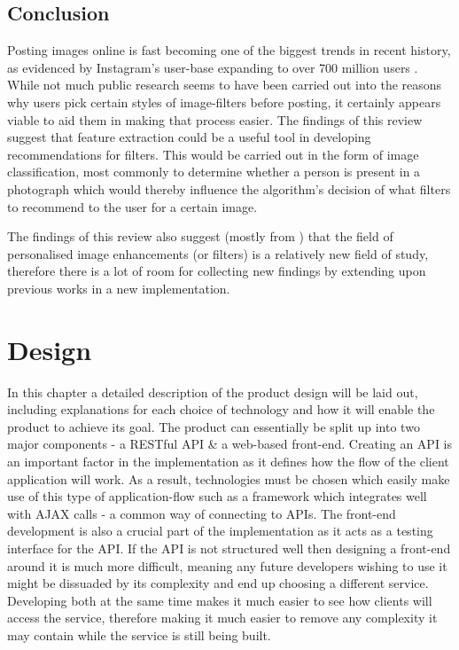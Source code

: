\documentclass[a4paper,12pt]{report}
\begin{document}
  \section{Conclusion}
    Posting images online is fast becoming one of the biggest trends in recent history, as evidenced by Instagram's user-base expanding to over 700 million users \citep{instagram2017users}. While not much public research seems to have been carried out into the reasons why users pick certain styles of image-filters before posting, it certainly appears viable to aid them in making that process easier.
    The findings of this review suggest that feature extraction could be a useful tool in developing recommendations for filters. This would be carried out in the form of image classification, most commonly to determine whether a person is present in a photograph which would thereby influence the algorithm's decision of what filters to recommend to the user for a certain image.

    The findings of this review also suggest (mostly from \cite{kang2010personalization,caicedo2011collaborative}) that the field of personalised image enhancements (or filters) is a relatively new field of study, therefore there is a lot of room for collecting new findings by extending upon previous works in a new implementation.

\chapter{Design}
  In this chapter a detailed description of the product design will be laid out, including explanations for each choice of technology and how it will enable the product to achieve its goal. The product can essentially be split up into two major components - a RESTful API \& a web-based front-end. Creating an API is an important factor in the implementation as it defines how the flow of the client application will work. As a result, technologies must be chosen which easily make use of this type of application-flow such as a framework which integrates well with AJAX calls - a common way of connecting to APIs. The front-end development is also a crucial part of the implementation as it acts as a testing interface for the API. If the API is not structured well then designing a front-end around it is much more difficult, meaning any future developers wishing to use it might be dissuaded by its complexity and end up choosing a different service. Developing both at the same time makes it much easier to see how clients will access the service, therefore making it much easier to remove any complexity it may contain while the service is still being built.
\end{document}
